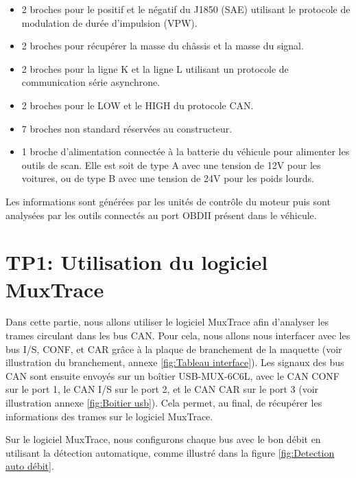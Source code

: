 \documentclass{rapportECC}
\begin{document}
\begin{itemize}
    \item 2 broches pour le positif et le négatif du J1850 (SAE) utilisant le protocole de modulation de durée d’impulsion (VPW).
    \item 2 broches pour récupérer la masse du châssis et la masse du signal.
    \item 2 broches pour la ligne K et la ligne L utilisant un protocole de communication série asynchrone.
    \item 2 broches pour le LOW et le HIGH du protocole CAN.
    \item 7 broches non standard réservées au constructeur.
    \item 1 broche d'alimentation connectée à la batterie du véhicule pour alimenter les outils de scan. Elle est soit de type A avec une tension de 12V pour les voitures, ou de type B avec une tension de 24V pour les poids lourds.
\end{itemize}

Les informations sont générées par les unités de contrôle du moteur puis sont analysées par les outils connectés au port OBDII présent dans le véhicule.


\section{TP1: Utilisation du logiciel MuxTrace}

Dans cette partie, nous allons utiliser le logiciel MuxTrace afin d'analyser les trames circulant dans les bus CAN. Pour cela, nous allons nous interfacer avec les bus I/S, CONF, et CAR grâce à la plaque de branchement de la maquette (voir illustration du branchement, annexe \ref{fig:Tableau interface}). Les signaux des bus CAN sont ensuite envoyés sur un boîtier USB-MUX-6C6L, avec le CAN CONF sur le port 1, le CAN I/S sur le port 2, et le CAN CAR sur le port 3 (voir illustration annexe \ref{fig:Boitier usb}). Cela permet, au final, de récupérer les informations des trames sur le logiciel MuxTrace. \pagebreak

Sur le logiciel MuxTrace, nous configurons chaque bus avec le bon débit en utilisant la détection automatique, comme illustré dans la figure \ref{fig:Detection auto débit}.
\end{document}
